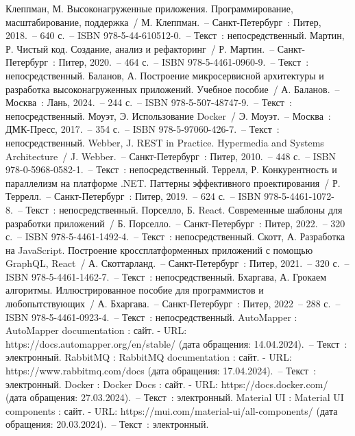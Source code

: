 \newsection
{}

\begin{thebibliography}{12}
	 Клеппман, М. Высоконагруженные приложения. Программирование, масштабирование, поддержка~/ М. Клеппман.~– Санкт-Петербург~: Питер, 2018.~– 640 с.~– ISBN 978-5-44-610512-0.~– Текст~: непосредственный.
		Мартин, Р. Чистый код. Создание, анализ и рефакторинг~/ Р. Мартин.~– Санкт-Петербург~: Питер, 2020.~– 464 с.~– ISBN 978-5-4461-0960-9.~– Текст~: непосредственный.
     Баланов, А. Построение микросервисной архитектуры и разработка высоконагруженных приложений. Учебное пособие~/ А. Баланов.~– Москва~: Лань, 2024.~– 244 с.~– ISBN 978-5-507-48747-9.~– Текст~: непосредственный.
	 Моуэт, Э. Использование Docker~/ Э. Моуэт.~– Москва~: ДМК-Пресс, 2017.~– 354 с.~– ISBN 978-5-97060-426-7.~– Текст~: непосредственный.
		Webber, J. REST in Practice. Hypermedia and Systems Architecture~/ J. Webber.~– Санкт-Петербург~: Питер, 2010.~– 448 с.~– ISBN 978-0-5968-0582-1.~– Текст~: непосредственный.
		Террелл, Р. Конкурентность и параллелизм на платформе .NET. Паттерны эффективного проектирования~/ Р. Террелл.~– Санкт-Петербург~: Питер, 2019.~– 624 с.~– ISBN 978-5-4461-1072-8.~– Текст~: непосредственный.
	 Порселло, Б. React. Современные шаблоны для разработки приложений~/ Б. Порселло.~– Санкт-Петербург~: Питер, 2022.~– 320 с.~– ISBN 978-5-4461-1492-4.~– Текст~: непосредственный.
	 Скотт, А. Разработка на JavaScript. Построение кроссплатформенных приложений с помощью GraphQL, React~/ А. Скоттарланд.~– Санкт-Петербург~: Питер, 2021.~– 320 с.~– ISBN 978-5-4461-1462-7.~– Текст~: непосредственный.
	 Бхаргава, А. Грокаем алгоритмы. Иллюстрированное пособие для программистов и любопытствующих~/ А. Бхаргава.~– Санкт-Петербург~: Питер, 2022~– 288 с.~– ISBN 978-5-4461-0923-4.~– Текст~: непосредственный.
	 AutoMapper : AutoMapper documentation : сайт. - URL: https://docs.automapper.org/en/stable/ (дата обращения: 14.04.2024).~– Текст~: электронный.
	 RabbitMQ : RabbitMQ  documentation : сайт. - URL: https://www.rabbitmq.com/docs (дата обращения: 17.04.2024).~– Текст~: электронный.
	 Docker : Docker  Docs : сайт. - URL: https://docs.docker.com/ (дата обращения: 27.03.2024).~– Текст~: электронный.
	 Material UI : Material UI components : сайт. - URL: https://mui.com/material-ui/all-components/ (дата обращения: 20.03.2024).~– Текст~: электронный.
\end{thebibliography}
